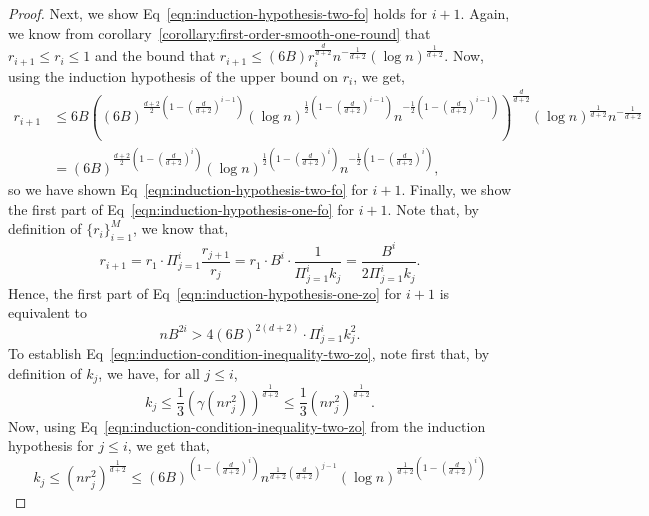 \begin{proof}
Next, we show Eq~\eqref{eqn:induction-hypothesis-two-fo} holds for $i+1$. 
Again, we know from corollary~\ref{corollary:first-order-smooth-one-round}
that $r_{i+1} \leq r_i \leq 1$ and the bound that 
$r_{i+1} \leq (6B) r_i^\frac{d}{d+2}n^{-\frac{1}{d+2}} (\log n)^\frac{1}{d+2}$. 
Now, using the induction hypothesis of the upper bound on $r_i$, we get, 
 \begin{align*}
 r_{i+1}  &\leq 6B \left((6B)^{\frac{d+2}{2}\left(1-\left(\frac{d}{d+2}\right)^{i-1}\right)}
		\left(\log n\right)^{\frac{1}{2}\left(1-\left(\frac{d}{d+2}\right)^{i-1}\right)}
		n^{-\frac{1}{2}\left(1-\left(\frac{d}{d+2}\right)^{i-1}\right)}\right)
			^\frac{d}{d+2} (\log n)^\frac{1}{d+2} n^{-\frac{1}{d+2}}  \\
	&= (6B)^{\frac{d+2}{2}\left(1-\left(\frac{d}{d+2}\right)^{i}\right)}
		\left(\log n\right)^{\frac{1}{2}\left(1-\left(\frac{d}{d+2}\right)^{i}\right)}
		n^{-\frac{1}{2}\left(1-\left(\frac{d}{d+2}\right)^{i}\right)},
 \end{align*}
so we have shown Eq~\eqref{eqn:induction-hypothesis-two-fo} for $i+1$. 
Finally, we show the first part of Eq~\eqref{eqn:induction-hypothesis-one-fo} 
for $i+1$. Note that, by definition of $\{r_i\}_{i=1}^M$, we know that, 
\begin{equation*}
r_{i+1} = r_1 \cdot \Pi_{j=1}^i \frac{r_{j+1}}{r_j} = r_1 \cdot B^i \cdot \frac{1}{\Pi_{j=1}^i k_j}
	= \frac{B^i}{2 \Pi_{j=1}^i k_j}. 
\end{equation*}
Hence, the first part of Eq~\eqref{eqn:induction-hypothesis-one-zo} 
for $i+1$ is equivalent to
\begin{equation}
\label{eqn:induction-condition-inequality-two-fo}
nB^{2i} > 4 (6B)^{2(d+2)} \cdot \Pi_{j=1}^{i} k_j^2. 
\end{equation}
To establish Eq~\eqref{eqn:induction-condition-inequality-two-zo}, note 
first that, by definition of $k_j$, we have, for all $j \leq i$, 
\begin{equation*}
k_j \leq \frac{1}{3} (\gamma(n r_j^2))^\frac{1}{d+2} \leq 
	 \frac{1}{3} (nr_j^2)^{\frac{1}{d+2}}. 
\end{equation*}
Now, using Eq~\eqref{eqn:induction-condition-inequality-two-zo} 
from the induction hypothesis for $j \leq i$, we get that, 
\begin{equation*}
k_j \leq (n r_j^2)^\frac{1}{d+2}  \leq 
	(6B)^{\left(1-\left(\frac{d}{d+2}\right)^i\right)}
	n^{\frac{1}{d+2}(\frac{d}{d+2})^{j-1}} (\log n)^{\frac{1}{d+2}\left(1-\left(\frac{d}{d+2}\right)^i\right)}

\end{equation*}
\end{proof}

